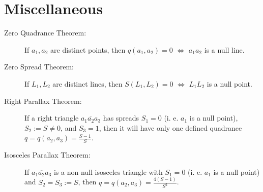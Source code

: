 \documentclass[DIV16,halfparskip]{scrartcl}
\begin{document}
\section{Miscellaneous}
\begin{description}
    \item [Zero Quadrance Theorem:] If $a_1, a_2$ are distinct points, then
        $q(a_1,a_2) = 0$ $\Leftrightarrow$ $a_1a_2$ is a null line.
    \item [Zero Spread Theorem:] If $L_1, L_2$ are distinct lines, then
        $S(L_1,L_2) = 0$ $\Leftrightarrow$ $L_1L_2$ is a null point.
    \item [Right Parallax Theorem:] If a right triangle $\overline{a_1a_2a_3}$
        has spreads $S_1=0$ (i. e. $a_1$ is a null point), $S_2 := S \neq 0$,
        and $S_3=1$, then it will have only one defined quadrance
        $q=q(a_2,a_3)=\frac{S-1}{S}$.
    \item [Isosceles Parallax Theorem:] If $\overline{a_1a_2a_3}$ is a non-null
        isosceles triangle with $S_1=0$ (i. e. $a_1$ is a null point) and $S_2
        = S_3 := S$, then $q=q(a_2,a_3)=\frac{4(S-1)}{S^2}$.
\end{description}
\end{document}
